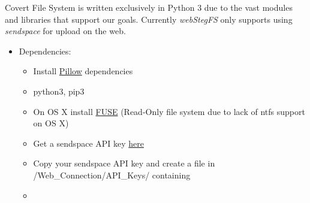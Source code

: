 \documentclass[letterpaper,12pt,openany,oneside]{sphinxmanual}
\begin{document}
Covert File System is written exclusively in Python 3 due to the vast modules and libraries that support our goals. Currently \emph{webStegFS} only supports using \emph{sendspace} for upload on the web.
\begin{itemize}
\item {} 
Dependencies:
\begin{itemize}
\item {} 
Install \href{https://pillow.readthedocs.org/en/3.0.0/installation.html}{Pillow} dependencies

\item {} 
python3, pip3 

\item {} 
On OS X install \href{https://osxfuse.github.io}{FUSE} (Read-Only file system due to lack of ntfs support on OS X)

\item {} 
Get a sendspace API key \href{https://www.sendspace.com/dev\_apikeys.html}{here}

\item {} 
Copy your sendspace API key and create a file in /Web\_Connection/API\_Keys/ containing 

\item {} 

\end{itemize}

\end{itemize}
\end{document}
